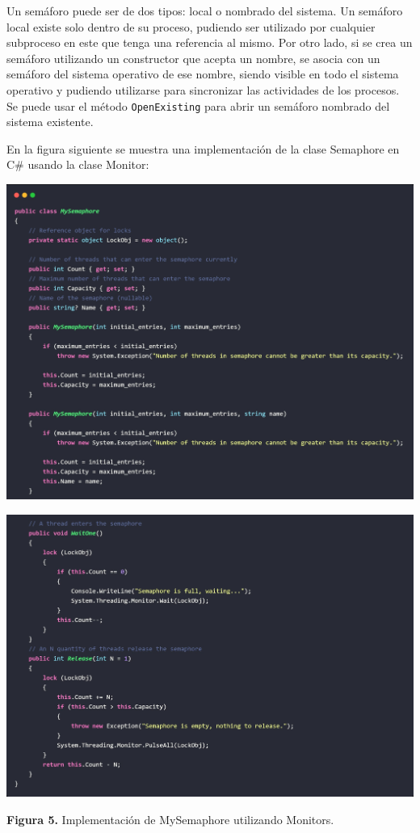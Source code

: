 \documentclass[10pt]{article} %
\newcommand{\csl}[1]{\colorbox{backcolour}{\texttt{#1}}}
\newcommand{\imgcaption}[2]{\tiny \textbf{Figura #1.} #2.}
\begin{document}
Un sem\'aforo puede ser de dos tipos: local o nombrado del sistema. Un semáforo local existe solo dentro de su proceso, pudiendo ser utilizado por cualquier subproceso en este que tenga una referencia al mismo. Por otro lado, si se crea un sem\'aforo utilizando un constructor que acepta un nombre, se asocia con un semáforo del sistema operativo de ese nombre, siendo visible en todo el sistema operativo y pudiendo utilizarse para sincronizar las actividades de los procesos. Se puede usar el método \csl{OpenExisting} para abrir un semáforo nombrado del sistema existente.

En la figura siguiente se muestra una implementación de la clase Semaphore en C\# usando la clase Monitor:

\begin{center}
	\includegraphics[width=15cm]{MySemaphore1.jpg}
\end{center}

\begin{center}
	\includegraphics[width=15cm]{MySemaphore2.jpg}
	
	\imgcaption{5}{Implementaci\'on de MySemaphore utilizando Monitors}
\end{center}
\end{document}
